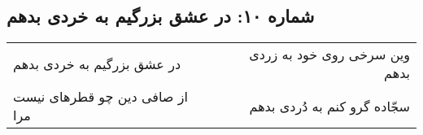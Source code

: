 \begin{center}
\section*{شماره ۱۰: در عشق بزرگیم به خردی بدهم}
\label{sec:010}
\begin{longtable}{l p{0.5cm} r}
در عشق بزرگیم به خردی بدهم
&&
وین سرخی روی خود به زردی بدهم
\\
از صافی دین چو قطرهای نیست مرا
&&
سجّاده گرو کنم به دُردی بدهم
\\
\end{longtable}
\end{center}
